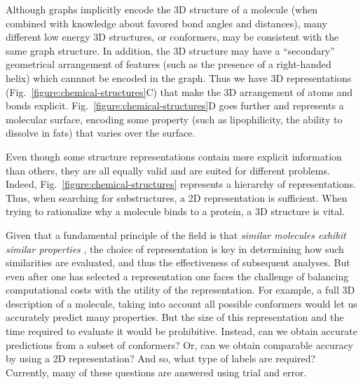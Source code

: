 \documentclass{sig-alternate}
\begin{document}
Although graphs implicitly encode the 3D structure of a molecule
(when combined with knowledge about favored bond angles and
distances), many different low energy 3D structures, or conformers,
may be consistent with the same graph structure. In addition, the 3D
structure may have a ``secondary'' geometrical arrangement of features
(such as the presence of a right-handed helix) which cannnot be
encoded in the graph. Thus we have 3D representations
(Fig.~\ref{figure:chemical-structures}C) that make the 3D arrangement
of atoms and bonds explicit. Fig.~\ref{figure:chemical-structures}D
goes further and represents a molecular surface, encoding some
property (such as lipophilicity, the ability to dissolve in fats) that varies over the surface.

Even though some structure representations contain more explicit
information than others, they are all equally valid and are suited for
different problems. Indeed, Fig.~\ref{figure:chemical-structures}
represents a hierarchy of representations. Thus, when searching for
substructures, a 2D representation is sufficient. When trying to
rationalize why a molecule binds to a protein, a 3D structure is
vital.

Given that a fundamental principle of the field is that \emph{similar
  molecules exhibit similar properties} \cite{Johnson:1990qf}, the
choice of representation is key in determining how such similarities
are evaluated, and thus the effectiveness of subsequent analyses. But
even after one has selected a representation one faces the challenge
of balancing computational costs with the utility of the
representation. For example, a full 3D description of a molecule,
taking into account all possible conformers would let us accurately
predict many properties. But the size of this representation and the
time required to evaluate it would be prohibitive. Instead, can we
obtain accurate predictions from a subset of conformers? Or, can we
obtain comparable accuracy by using a 2D representation? And so,
what type of labels are required? Currently, many of these questions
are answered using trial and error.
\end{document}
